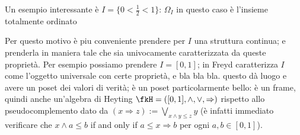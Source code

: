 \documentclass{amsart}
\begin{document}
\begin{remark}
  Un esempio interessante è $I=\{0<\frac{1}{2}< 1\}$: $\Omega_I$ in questo caso è l'insieme totalmente ordinato %

  Per questo motivo è piu conveniente prendere per $I$ una struttura continua; e prenderla in maniera tale che sia univocamente caratterizzata da queste proprietà. Per esempio possiamo prendere $I=[0,1]$; in \cite{} Freyd caratterizza $I$ come l'oggetto universale con certe proprietà, e bla bla bla. questo dà luogo e avere un poset dei valori di verità; è un poset particolarmente bello: è un frame, quindi anche un'algebra di Heyting $\fkH =([0,1],\land,\lor,\Rightarrow)$ rispetto allo pseudocomplemento dato da $(x \Rightarrow z) := \bigvee_{x\land y \le z} y$ (è infatti immediato verificare che $x \land a \le b$ if and only if $a \le x \Rightarrow b$ per ogni $a,b\in [0,1]$).
\end{remark}
\end{document}
